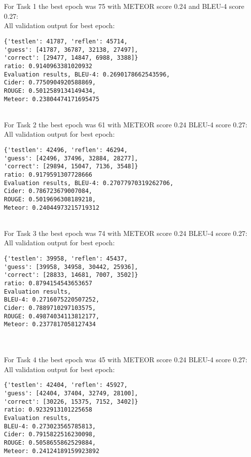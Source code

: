 \documentclass[12pt, letterpaper, twoside]{article}
\begin{document}
\ \\
\newpage
\ \\
For Task 1 the best epoch was 75 with METEOR score 0.24 and BLEU-4 score 0.27:\\
All validation output for best epoch:\\
\begin{verbatim}
{'testlen': 41787, 'reflen': 45714, 
'guess': [41787, 36787, 32138, 27497], 
'correct': [29477, 14847, 6988, 3388]}
ratio: 0.9140963381020932
Evaluation results, BLEU-4: 0.2690178662543596,
Cider: 0.7750904920588869,  
ROUGE: 0.5012589134149434, 
Meteor: 0.23804474171695475
\end{verbatim}
\ \\
For Task 2 the best epoch was 61 with METEOR score 0.24 BLEU-4 score 0.27:\\
All validation output for best epoch:\\
\begin{verbatim}
{'testlen': 42496, 'reflen': 46294, 
'guess': [42496, 37496, 32884, 28277], 
'correct': [29894, 15047, 7136, 3548]}
ratio: 0.9179591307728666
Evaluation results, BLEU-4: 0.27077970319262706, 
Cider: 0.786723679007084,  
ROUGE: 0.5019696308189218, 
Meteor: 0.24044973215719312
\end{verbatim}
\ \\
For Task 3 the best epoch was 74 with METEOR score 0.24 BLEU-4 score 0.27:\\
All validation output for best epoch:\\
\begin{verbatim}
{'testlen': 39958, 'reflen': 45437, 
'guess': [39958, 34958, 30442, 25936], 
'correct': [28833, 14681, 7007, 3502]}
ratio: 0.8794154543653657
Evaluation results, 
BLEU-4: 0.2716075220507252, 
Cider: 0.7889710297103575, 
ROUGE: 0.49874034113812177, 
Meteor: 0.2377817058127434
\end{verbatim}
\ \\
\newpage
\ \\
For Task 4 the best epoch was 45 with METEOR score 0.24 BLEU-4 score 0.27:\\
All validation output for best epoch:\\
\begin{verbatim}
{'testlen': 42404, 'reflen': 45927, 
'guess': [42404, 37404, 32749, 28100], 
'correct': [30226, 15375, 7152, 3402]}
ratio: 0.9232913101225658
Evaluation results, 
BLEU-4: 0.273023565785813, 
Cider: 0.7915822516230098,  
ROUGE: 0.5058655862529884,
Meteor: 0.24124189159923892
\end{verbatim}
\end{document}
